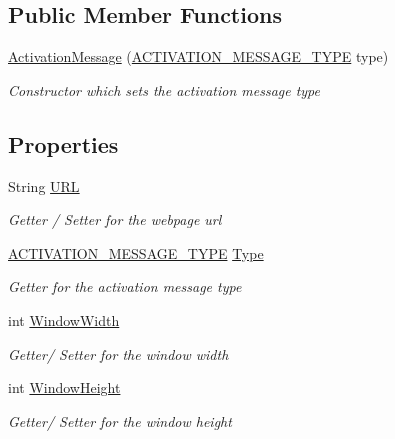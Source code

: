 \subsection*{Public Member Functions}
\begin{DoxyCompactItemize}
\item 
\hyperlink{class_web_analyzer_1_1_models_1_1_message_model_1_1_activation_message_a20a171686a029b6466062511e4ca2fda}{Activation\+Message} (\hyperlink{class_web_analyzer_1_1_models_1_1_message_model_1_1_activation_message_ad3b5847039dd26527a842c6f7675b1b2}{A\+C\+T\+I\+V\+A\+T\+I\+O\+N\+\_\+\+M\+E\+S\+S\+A\+G\+E\+\_\+\+T\+Y\+P\+E} type)
\begin{DoxyCompactList}\small\item\em Constructor which sets the activation message type \end{DoxyCompactList}\end{DoxyCompactItemize}
\subsection*{Properties}
\begin{DoxyCompactItemize}
\item 
String \hyperlink{class_web_analyzer_1_1_models_1_1_message_model_1_1_activation_message_a4df0cf1fbf60a7211a5ee55831adcb9e}{U\+R\+L}
\begin{DoxyCompactList}\small\item\em Getter / Setter for the webpage url \end{DoxyCompactList}\item 
\hyperlink{class_web_analyzer_1_1_models_1_1_message_model_1_1_activation_message_ad3b5847039dd26527a842c6f7675b1b2}{A\+C\+T\+I\+V\+A\+T\+I\+O\+N\+\_\+\+M\+E\+S\+S\+A\+G\+E\+\_\+\+T\+Y\+P\+E} \hyperlink{class_web_analyzer_1_1_models_1_1_message_model_1_1_activation_message_a0f68201fb8faad6d3a2a074bc7670313}{Type}
\begin{DoxyCompactList}\small\item\em Getter for the activation message type \end{DoxyCompactList}\item 
int \hyperlink{class_web_analyzer_1_1_models_1_1_message_model_1_1_activation_message_adb9b326b9f17dd3dbe0ef8a645b7b38b}{Window\+Width}
\begin{DoxyCompactList}\small\item\em Getter/ Setter for the window width \end{DoxyCompactList}\item 
int \hyperlink{class_web_analyzer_1_1_models_1_1_message_model_1_1_activation_message_aa7179d1f480e697fdd30d43b6919c076}{Window\+Height}
\begin{DoxyCompactList}\small\item\em Getter/ Setter for the window height \end{DoxyCompactList}\end{DoxyCompactItemize}
